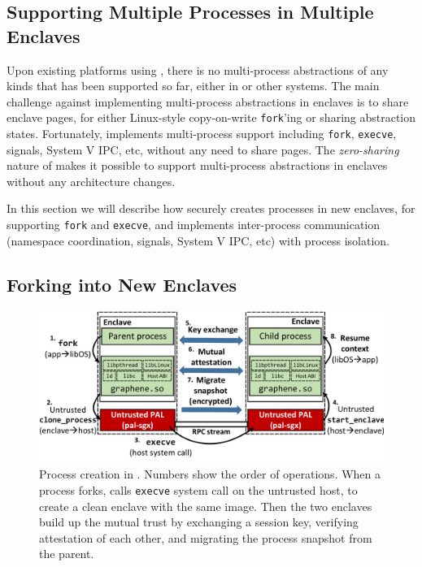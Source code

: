 \subsection{Supporting Multiple Processes in Multiple Enclaves}
\label{sec:gsgx:multiproc}

Upon existing platforms using \sgx{}, there is no
multi-process abstractions of any kinds that has been supported so far,
either in \haven{} or other systems.
The main challenge against
implementing multi-process abstractions in enclaves
is to share enclave pages,
for either Linux-style copy-on-write {\tt fork}'ing or
sharing abstraction states.
Fortunately, \graphene{} implements multi-process support
including {\tt fork}, {\tt execve}, signals, System V IPC, etc,
without any need to share pages.
The {\it zero-sharing} nature of \graphene{} makes it possible
to support multi-process abstractions in enclaves
without any architecture changes.

In this section we will describe how \sysname{} securely creates
processes in new enclaves,
for supporting {\tt fork} and {\tt execve},
and implements inter-process communication
(namespace coordination, signals, System V IPC, etc)
with process isolation.

\subsection{Forking into New Enclaves}
\label{sec:gsgx:multiproc:fork}

\begin{figure}[t!]
\centering
\includegraphics[width=5in]{graphene-sgx/figures/fork.pdf}
\footnotesize
\caption[Process creation in \sysname{}]
{Process creation in \sysname{}.
Numbers show the order of operations.
When a process forks, \sysname{} calls {\tt execve} system call
on the untrusted host,
to create a clean enclave with the same \libos{} image.
Then the two enclaves build up the mutual trust by
exchanging a session key, verifying attestation of each other,
and migrating the process snapshot from the parent.}
\label{fig:gsgx:fork}
\end{figure}

